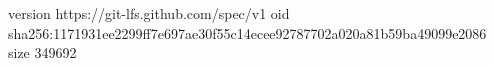 version https://git-lfs.github.com/spec/v1
oid sha256:1171931ee2299ff7e697ae30f55c14ecee92787702a020a81b59ba49099e2086
size 349692
